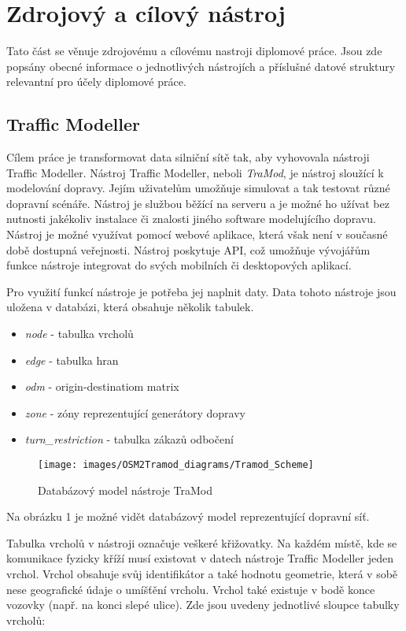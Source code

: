 \chapter{Zdrojový a cílový nástroj}

Tato část se věnuje zdrojovému a cílovému nastroji diplomové práce. Jsou zde popsány obecné informace o jednotlivých nástrojích a příslušné datové struktury relevantní pro účely diplomové práce. 

\section{Traffic Modeller}

Cílem práce je transformovat data silniční sítě tak, aby vyhovovala nástroji Traffic Modeller. Nástroj Traffic Modeller, neboli \textit{TraMod}, je nástroj sloužící k modelování dopravy. Jejím uživatelům umožňuje simulovat a tak testovat různé dopravní scénáře. Nástroj je službou běžící na serveru a je možné ho užívat bez nutnosti jakékoliv instalace či znalosti jiného software modelujícího dopravu. Nástroj je možné využívat pomocí webové aplikace, která však není v současné době dostupná veřejnosti. Nástroj poskytuje API, což umožňuje vývojářům funkce nástroje integrovat do svých mobilních či desktopových aplikací. 

Pro využití funkcí nástroje je potřeba jej naplnit daty. Data tohoto nástroje jsou uložena v databázi, která obsahuje několik tabulek. 

\begin{itemize}
  \item \textit{node} - tabulka vrcholů
  \item \textit{edge} - tabulka hran
  \item \textit{odm} - origin-destinatiom matrix
  \item \textit{zone} - zóny reprezentující generátory dopravy
  \item \textit{turn\_restriction} - tabulka zákazů odbočení
\end{itemize}

\begin{figure}[htbp]
\texttt{[image: images/OSM2Tramod\_diagrams/Tramod\_Scheme]}
\caption{Databázový model nástroje TraMod}
\label{obr:1}
\end{figure}

Na obrázku 1 je možné vidět databázový model reprezentující dopravní síť. 

Tabulka vrcholů v nástroji označuje veškeré křižovatky. Na každém místě, kde se komunikace fyzicky kříží musí existovat v datech nástroje Traffic Modeller jeden vrchol. Vrchol obsahuje svůj identifikátor a také hodnotu geometrie, která v sobě nese geografické údaje o umíšťění vrcholu. Vrchol také existuje v bodě konce vozovky (např. na konci slepé ulice). Zde jsou uvedeny jednotlivé sloupce tabulky vrcholů: 

